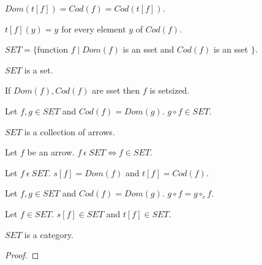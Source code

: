 \documentclass{article}
\newcommand{\mcirc}{\circ_{c}}
\newcommand{\inn}{~\epsilon~}
\newcommand{\innn}{~\epsilon~} %
\begin{document}
\begin{forthel}
\begin{axiom}
			$Dom(t[f])=Cod(f)=Cod(t[f])$.
		\end{axiom}
		
		\begin{axiom} 
			$t[f](y)=y$ for every element $y$ of $Cod(f)$.
		\end{axiom}
		
		\begin{definition} 
		\begin{center}
			$SET = \{ $function $f \mid Dom(f)$ is an sset and $Cod(f)$ is an sset $\}$.
		\end{center}
			
		\end{definition}
		
		\begin{axiom} 
			$SET$ is a set.
		\end{axiom}
		
		\begin{axiom} 
			If $Dom(f), Cod(f)$ are sset then $f$ is setsized.
		\end{axiom}
		
		\begin{lemma}
			Let $f,g \in SET$ and $Cod(f)=Dom(g)$. $g \circ f \in SET$.
		\end{lemma}
		

		
		\begin{axiom}
			$SET$ is a collection of arrows.
		\end{axiom}


		
		\begin{axiom}
			Let $f$ be an arrow. $f \inn SET \iff f \in SET$.
		\end{axiom}
		
		\begin{axiom}
		  Let $f \innn SET$. $s[f]=Dom(f)$ and $t[f]=Cod(f)$.
		\end{axiom}
		
		\begin{axiom} 
			Let $f,g \in SET$ and $Cod(f)=Dom(g)$. $g \circ f = g \mcirc f$.
		\end{axiom}

		\begin{lemma}
		Let $f\in SET$. $s[f] \in SET$ and $t[f] \in SET$.
		\end{lemma}
		
		\begin{theorem} 
			$SET$ is a category.
		\end{theorem}
		\begin{proof}
			

\end{proof}
\end{forthel}
\end{document}
